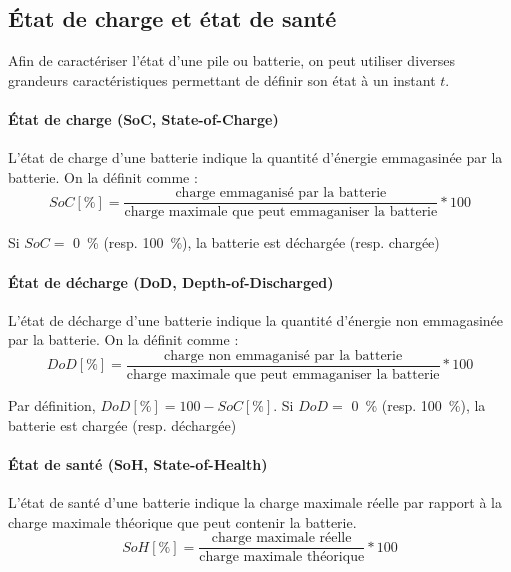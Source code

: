 \subsection{État de charge et état de santé}
Afin de caractériser l'état d'une pile ou batterie, on peut utiliser diverses grandeurs caractéristiques permettant de définir son état à un instant $t$.

\paragraph*{\'{E}tat de charge (SoC, State-of-Charge)} L'état de charge d'une batterie indique la quantité d'énergie emmagasinée par la batterie. On la définit comme : 
\begin{equation*}
    SoC [\si{\percent}]= \frac{\text{charge emmaganisé par la batterie}}{\text{charge maximale que peut emmaganiser la batterie}} * 100
    \label{eq:SoC}
\end{equation*}

Si $SoC =$ \SI{0}{\percent} (resp. \SI{100}{\percent}), la batterie est déchargée (resp. chargée)


\paragraph*{\'{E}tat de décharge (DoD, Depth-of-Discharged)} L'état de décharge d'une batterie indique la quantité d'énergie non emmagasinée par la batterie. On la définit comme : 
\begin{equation*}
    DoD [\si{\percent}]= \frac{\text{charge non emmaganisé par la batterie}}{\text{charge maximale que peut emmaganiser la batterie}} * 100
    \label{eq:DoD}
\end{equation*}

Par définition, $DoD [\si{\percent}] = 100 - SoC [\si{\percent}]$. Si $DoD =$ \SI{0}{\percent} (resp. \SI{100}{\percent}), la batterie est chargée (resp. déchargée)

\paragraph*{\'{E}tat de santé (SoH, State-of-Health)} L'état de santé d'une batterie indique la charge maximale réelle par rapport à la charge maximale théorique que peut contenir la batterie.
\begin{equation*}
    SoH [\si{\percent}]= \frac{\text{charge maximale réelle}}{\text{charge maximale théorique}} * 100
    \label{eq:SoH}
\end{equation*}

